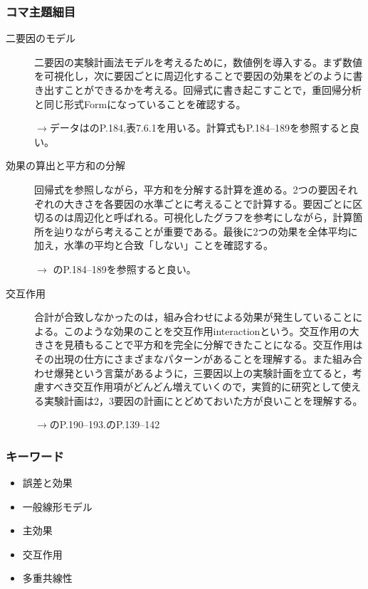\subsubsection{コマ主題細目}
\begin{description}

	\item[二要因のモデル]二要因の実験計画法モデルを考えるために，数値例を導入する。まず数値を可視化し，次に要因ごとに周辺化することで要因の効果をどのように書き出すことができるかを考える。回帰式に書き起こすことで，重回帰分析と同じ形式Formになっていることを確認する。
	      \begin{flushright}
		      $\to$データは\citet{Yamada2004}のP.184,表7.6.1を用いる。計算式もP.184--189を参照すると良い。
	      \end{flushright}

	\item[効果の算出と平方和の分解]回帰式を参照しながら，平方和を分解する計算を進める。2つの要因それぞれの大きさを各要因の水準ごとに考えることで計算する。要因ごとに区切るのは周辺化と呼ばれる。可視化したグラフを参考にしながら，計算箇所を辿りながら考えることが重要である。最後に2つの効果を全体平均に加え，水準の平均と合致「しない」ことを確認する。
	      \begin{flushright}
		      $\to$ \citet{Yamada2004}のP.184--189を参照すると良い。
	      \end{flushright}

	\item[交互作用]合計が合致しなかったのは，組み合わせによる効果が発生していることによる。このような効果のことを交互作用interactionという。交互作用の大きさを見積もることで平方和を完全に分解できたことになる。交互作用はその出現の仕方にさまざまなパターンがあることを理解する。また組み合わせ爆発という言葉があるように，三要因以上の実験計画を立てると，考慮すべき交互作用項がどんどん増えていくので，実質的に研究として使える実験計画は2，3要因の計画にとどめておいた方が良いことを理解する。
	      \begin{flushright}
		      $\to$\citet{Yamada2004}のP.190--193.\citet{kosugi2019}のP.139--142
	      \end{flushright}


\end{description}
\subsubsection{キーワード}
\begin{itemize}
	\item 誤差と効果
	\item 一般線形モデル
	\item 主効果
	\item 交互作用
	\item 多重共線性
\end{itemize}

